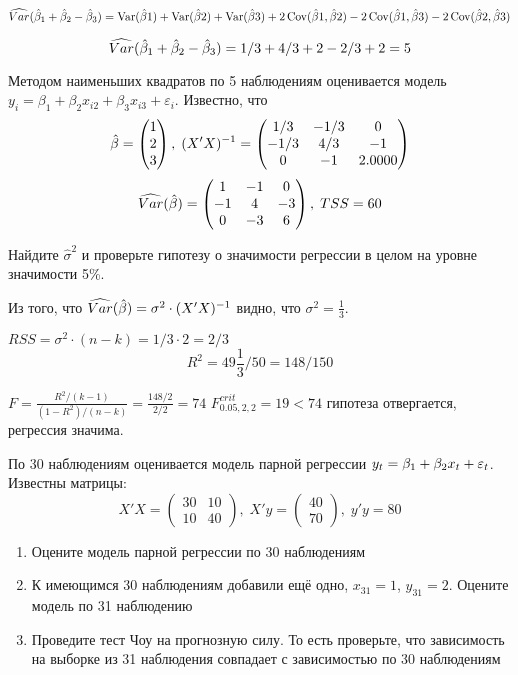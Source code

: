 \begin{solution}
\[\widehat{Var}(\hat{\beta}_1+\hat{\beta}_2-\hat{\beta}_3)=\operatorname{Var}(\hat{\beta}1)+\operatorname{Var}(\hat{\beta}2)+\operatorname{Var}(\hat{\beta}3)+
2\operatorname{Cov}(\hat{\beta}1,\hat{\beta}2)-2\operatorname{Cov}(\hat{\beta}1,\hat{\beta}3)-2\operatorname{Cov}(\hat{\beta}2,\hat{\beta}3)\]

\[\widehat{Var}(\hat{\beta}_1+\hat{\beta}_2-\hat{\beta}_3)=1/3+4/3+2-2/3+2=5\]
\end{solution}

\begin{problem}
Методом наименьших квадратов по 5 наблюдениям оценивается модель $y_i=\beta_1+\beta_2 x_{i2}+\beta_3 x_{i3}+\varepsilon_i$. Известно, что
\[
\hat{\beta}=\begin{pmatrix}
1 \\
2 \\
3
\end{pmatrix}, \;
(X'X)^{-1}= \begin{pmatrix} 
1/3 & -1/3 & 0 \\ 
-1/3 & 4/3 & -1 \\ 
0 & -1 & 2.0000 
\end{pmatrix}
\]
\[
\widehat{Var}(\hat{\beta})=\begin{pmatrix}
1 & -1 & 0 \\
-1 & 4 & -3 \\ 
0 & -3 & 6
\end{pmatrix}, \; TSS=60
\]

Найдите $\hat{\sigma}^2$ и проверьте гипотезу о значимости регрессии в целом на уровне значимости 5\%.
\end{problem}

\begin{solution}
Из того, что $\widehat{Var}(\hat{\beta})=\sigma^2\cdot (X'X)^{-1}$ видно, что $\sigma^2=\frac13$.

$RSS=\sigma^2\cdot(n-k)=1/3\cdot 2=2/3$
\[R^2=49\frac13/50=148/150\]


$F=\frac{R^2/(k-1)}{(1-R^2)/(n-k)}=\frac{148/2}{2/2}=74$
$F^{crit}_{0.05, 2,2}=19<74$
гипотеза отвергается, регрессия значима.

\end{solution}



\begin{problem}
По 30 наблюдениям оценивается модель парной регрессии $y_t=\beta_1 + \beta_2 x_t + \varepsilon_t$. Известны матрицы:
\[
X'X=\begin{pmatrix}
30 & 10 \\
10 & 40
\end{pmatrix}, \;
X'y=\begin{pmatrix}
40 \\
70 
\end{pmatrix}, \;
y'y=80
\]

\begin{enumerate}
\item Оцените модель парной регрессии по 30 наблюдениям
\item К имеющимся 30 наблюдениям добавили ещё одно, $x_{31}=1$, $y_{31}=2$. Оцените модель по 31 наблюдению
\item Проведите тест Чоу на прогнозную силу. То есть проверьте, что зависимость на выборке из  31 наблюдения совпадает с зависимостью по 30 наблюдениям
\end{enumerate}
\end{problem}

\begin{solution}
\end{solution}



